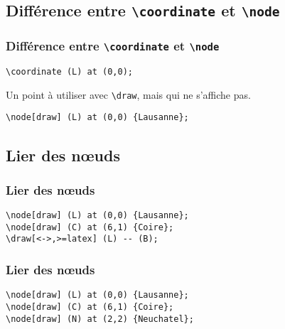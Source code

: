 \documentclass{clic_latex_beamer}
\begin{document}
\subsection{Différence entre \texttt{\textbackslash coordinate} et \texttt{\textbackslash node}}
\begin{frame}[fragile]
\frametitle{Différence entre \texttt{\textbackslash coordinate} et \texttt{\textbackslash node}}

\begin{lstlisting}
\coordinate (L) at (0,0);
\end{lstlisting}

\pause

Un point à utiliser avec \texttt{\textbackslash draw}, mais qui ne s'affiche pas.

\pause
\vspace{1cm}

\begin{lstlisting}
\node[draw] (L) at (0,0) {Lausanne};
\end{lstlisting}

\pause


\end{frame}

\subsection{Lier des nœuds}
\begin{frame}[fragile]
\frametitle{Lier des nœuds}

\begin{lstlisting}
\node[draw] (L) at (0,0) {Lausanne};
\node[draw] (C) at (6,1) {Coire};
\draw[<->,>=latex] (L) -- (B);
\end{lstlisting}

\pause


\end{frame}

\begin{frame}[fragile]
\frametitle{Lier des nœuds}


\begin{lstlisting}
\node[draw] (L) at (0,0) {Lausanne};
\node[draw] (C) at (6,1) {Coire};
\node[draw] (N) at (2,2) {Neuchatel};
\end{lstlisting}

\end{frame}
\end{document}
